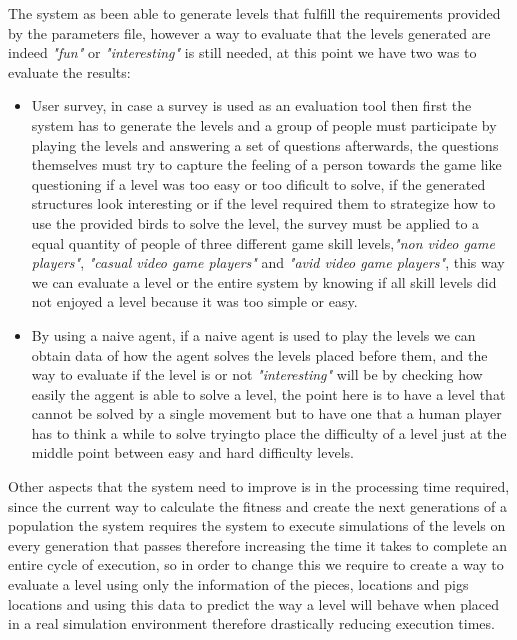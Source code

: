 \documentclass[conference]{IEEEtran}
\begin{document}
    The system as been able to generate levels that fulfill the requirements
     provided by the parameters file, however a way to evaluate that the levels
     generated are indeed \textit{"fun"} or \textit{"interesting"} is still needed,
     at this point we have two was to evaluate the results:
     \begin{itemize}
        \item User survey, in case a survey is used as an evaluation tool then first
        the system has to generate the levels and a group of people must participate
        by playing the levels and answering a set of questions afterwards, the
        questions themselves must try to capture the feeling of a person towards the
        game like questioning if a level was too easy or too dificult to solve, if
        the generated structures look interesting or if the level required them to
        strategize how to use the provided birds to solve the level, the survey must
        be applied to a equal quantity of people of three different game skill
        levels,\textit{"non video game players"}, \textit{"casual video game
        players"} and \textit{"avid video game players"}, this way we can evaluate a
        level or the entire system by knowing if all skill levels did not enjoyed a
        level because it was too simple or easy.
        \item By using a naive agent, if a naive agent is used to play the levels we
        can obtain data of how the agent solves the levels placed before them, and
        the way to evaluate if the level is or not \textit{"interesting"} will be by
        checking how easily the aggent is able to solve a level, the point here is
        to have a level that cannot be solved by a single movement but to have one
        that a human player has to think a while to solve tryingto place the
        difficulty of a level just at the middle point between easy and hard
        difficulty levels.
    \end{itemize}
    
    Other aspects that the system need to improve is in the processing time
    required, since the current way to calculate the fitness and create the next
    generations of a population the system requires the system to execute
    simulations of the levels on every generation that passes therefore increasing
    the time it takes to complete an entire cycle of execution, so in order to
    change this we require to create a way to evaluate a level using only the
    information of the pieces, locations and pigs locations and using this data to
    predict the way a level will behave when placed in a real simulation environment
    therefore drastically reducing execution times.
    
\end{document}
